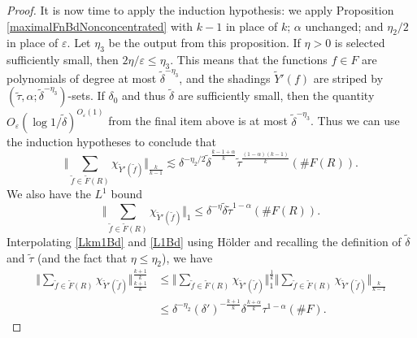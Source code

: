 \documentclass[10pt,a4paper]{amsart}
\newcommand{\eps}{\varepsilon}
\begin{document}
\begin{proof}
It is now time to apply the induction hypothesis: we apply Proposition \ref{maximalFnBdNonconcentrated} with $k-1$ in place of $k$; $\alpha$ unchanged; and $\eta_2/2$ in place of $\eps$. Let $\eta_3$ be the output from this proposition. If $\eta>0$ is selected sufficiently small, then $2\eta/\eps\leq\eta_3$. This means that the functions $f\in F$ are polynomials of degree at most $\tilde\delta^{-\eta_3}$, and the shadings $\tilde Y'(f)$ are striped by $(\tilde\tau,\alpha;\tilde\delta^{-\eta_3})$-sets. If $\delta_0$ and thus $\tilde\delta$ are sufficiently small, then the quantity $O_{\eps}(\log 1/\tilde\delta)^{O_\eps(1)}$ from the final item above is at most $\tilde\delta^{-\eta_3}$. Thus we can use the induction hypotheses to conclude that 
\begin{equation}\label{Lkm1Bd}
\Big \Vert \sum_{\tilde f\in \tilde F(R) }\chi_{\tilde Y'(\tilde f)}\Big\Vert_{\frac{k}{k-1}}\lesssim \delta^{-\eta_2/2}\tilde\delta^{\frac{k-1+\alpha}{k}} \tilde\tau^{\frac{(1-\alpha)(k-1)}{k}} (\#F(R)).
\end{equation}
We also have the $L^1$ bound
\begin{equation}\label{L1Bd}
\Big \Vert \sum_{\tilde f\in \tilde F(R) }\chi_{\tilde Y'(\tilde f)}\Big\Vert_{1} \leq \delta^{-\eta}\tilde\delta\tilde\tau^{1-\alpha}(\#F(R)).
\end{equation}
Interpolating \eqref{Lkm1Bd} and \eqref{L1Bd} using H\"older and recalling the definition of $\tilde\delta$ and $\tilde\tau$ (and the fact that $\eta\leq\eta_2$), we have
\begin{equation*}
\begin{split}
\Big \Vert \sum_{\tilde f\in \tilde F(R) }\chi_{\tilde Y'(\tilde f)}\Big\Vert_{\frac{k+1}{k}}^{\frac{k+1}{k}} 
& \leq \Big \Vert \sum_{\tilde f\in \tilde F(R) }\chi_{\tilde Y'(\tilde f)}\Big\Vert_{1}^{\frac{1}{k}} \Big \Vert \sum_{\tilde f\in \tilde F(R) }\chi_{\tilde Y'(\tilde f)}\Big\Vert_{\frac{k}{k-1}}\\
& \leq \delta^{-\eta_2}(\delta')^{-\frac{k+1}{k}} \delta^{\frac{k+\alpha}{k}}\tau^{1-\alpha}(\#F).
\end{split}
\end{equation*}


\end{proof}
\end{document}
